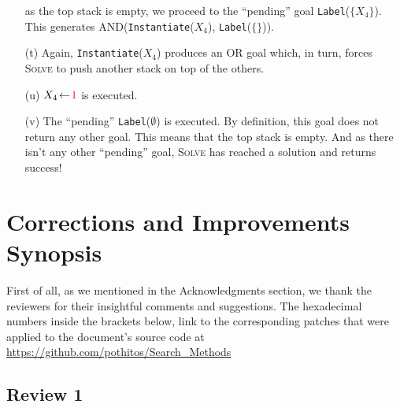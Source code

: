 \documentclass{ws-ijait}
\begin{document}
\begin{enumerate}
             as the top stack is empty, we proceed to the
             ``pending'' goal \texttt{Label}($\{X_4\}$).
             This generates
             \textsf{AND}(\texttt{Instantiate}($X_4$),
             \texttt{Label}($\{\}$)).
  \item[(t)] Again, \texttt{Instantiate}($X_4$) produces an
             \textsf{OR} goal which, in turn, forces
             \textsc{Solve} to push another stack on top of
             the others.
  \item[(u)] $X_4 \! \gets \! \textcolor{red}{1}$ is
             executed.
  \item[(v)] The ``pending'' \texttt{Label}($\emptyset$) is
             executed. By definition, this goal does not
             return any other goal. This means that the top
             stack is empty. And as there isn't any other
             ``pending'' goal, \textsc{Solve} has reached a
             solution and returns success!
\end{enumerate}

\clearpage


\section*{\centering Corrections and Improvements Synopsis}

First of all, as we mentioned in the Acknowledgments
section, we thank the reviewers for their insightful
comments and suggestions. The hexadecimal numbers inside the
brackets below, link to the corresponding patches that were
applied to the document's source code at
\url{https://github.com/pothitos/Search_Methods}

\newcommand{\commit}[1]{\texttt{[\href{https://github.com/pothitos/Search_Methods/commit/#1}{#1}]}}

\subsection*{Review 1}
\end{document}
